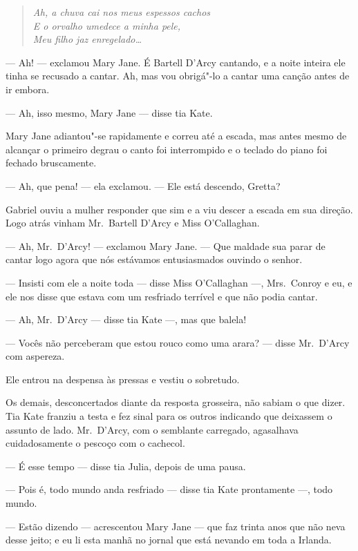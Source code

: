 \begin{verse}\itshape
Ah, a chuva cai nos meus espessos cachos\\
E o orvalho umedece a minha pele,\\
Meu filho jaz enregelado\ldots{}
\end{verse}

--- Ah! --- exclamou Mary Jane.  É Bartell D’Arcy cantando, e a noite inteira
ele tinha se recusado a cantar.  Ah, mas vou obrigá"-lo a cantar uma canção
antes de ir embora.

--- Ah, isso mesmo, Mary Jane --- disse tia Kate.

Mary Jane adiantou"-se rapidamente e correu até a escada, mas antes mesmo de
alcançar o primeiro degrau o canto foi interrompido e o teclado do piano foi
fechado bruscamente.

--- Ah, que pena! --- ela exclamou.  --- Ele está descendo, Gretta?

Gabriel ouviu a mulher responder que sim e a viu descer a escada em sua
direção.  Logo atrás vinham Mr.~Bartell D’Arcy e Miss O’Callaghan.

--- Ah, Mr.~D’Arcy! --- exclamou Mary Jane.  --- Que maldade sua parar de
cantar logo agora que nós estávamos entusiasmados ouvindo o senhor.

--- Insisti com ele a noite toda --- disse Miss O’Callaghan ---, Mrs.~Conroy e
eu, e ele nos disse que estava com um resfriado terrível e que não podia
cantar.

--- Ah, Mr.~D’Arcy --- disse tia Kate ---, mas que balela!

--- Vocês não perceberam que estou rouco como uma arara? --- disse Mr.~D’Arcy
com aspereza.

Ele entrou na despensa às pressas e vestiu o sobretudo.

Os demais, desconcertados diante da resposta grosseira, não sabiam o que dizer.
Tia Kate franziu a testa e fez sinal para os outros indicando que deixassem o
assunto de lado.  Mr.~D’Arcy, com o semblante carregado, agasalhava
cuidadosamente o pescoço com o cachecol.

--- É esse tempo --- disse tia Julia, depois de uma pausa.

--- Pois é, todo mundo anda resfriado --- disse tia Kate prontamente ---, todo
mundo.

--- Estão dizendo --- acrescentou Mary Jane --- que faz trinta anos que não
neva desse jeito; e eu li esta manhã no jornal que está nevando em toda a
Irlanda.

